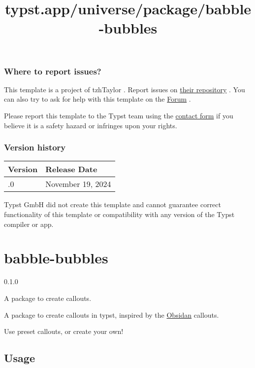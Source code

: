 \subsubsection{Where to report issues?}\label{where-to-report-issues}

This template is a project of tzhTaylor . Report issues on
\href{https://github.com/tzhTaylor/typst-sjtu-thesis-master}{their
repository} . You can also try to ask for help with this template on the
\href{https://forum.typst.app}{Forum} .

Please report this template to the Typst team using the
\href{https://typst.app/contact}{contact form} if you believe it is a
safety hazard or infringes upon your rights.

\label{versions}
\subsubsection{Version history}\label{version-history}

\begin{longtable}[]{@{}ll@{}}
\toprule\noalign{}
Version & Release Date \\
\midrule\noalign{}
\endhead
\bottomrule\noalign{}
\endlastfoot
0.1.0 & November 19, 2024 \\
\end{longtable}

Typst GmbH did not create this template and cannot guarantee correct
functionality of this template or compatibility with any version of the
Typst compiler or app.


\title{typst.app/universe/package/babble-bubbles}

\label{banner}
\section{babble-bubbles}\label{babble-bubbles}

{ 0.1.0 }

A package to create callouts.

\label{readme}
A package to create callouts in typst, inspired by the
\href{https://obsidian.md/}{Obsidan} callouts.

Use preset callouts, or create your own!


\subsection{Usage}\label{usage}

